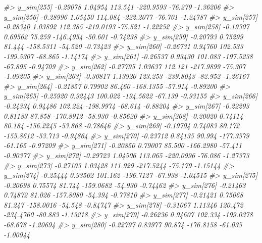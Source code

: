 \documentclass[
  10pt,
  italian,
  a4paper,
  extrafontsizes,onecolumn,openright
  ]{memoir}
\newenvironment{Shaded}{\begin{snugshade}}{\end{snugshade}}
\newcommand{\CommentTok}[1]{\textcolor[rgb]{0.56,0.35,0.01}{\textit{#1}}}
\begin{document}
\begin{Shaded}
\begin{Highlighting}[]
\CommentTok{\#\textgreater{} y\_sim[255] {-}0.29078 1.04954 113.541 {-}220.9593 {-}76.279 {-}1.36206}
\CommentTok{\#\textgreater{} y\_sim[256] {-}0.28996 1.05450 114.084 {-}222.2077 {-}76.701 {-}1.24787}
\CommentTok{\#\textgreater{} y\_sim[257] {-}0.28340 1.03892 112.385 {-}219.0193 {-}75.521 {-}1.22252}
\CommentTok{\#\textgreater{} y\_sim[258] {-}0.19307 0.69562  75.259 {-}146.4954 {-}50.601 {-}0.74238}
\CommentTok{\#\textgreater{} y\_sim[259] {-}0.20793 0.75299  81.444 {-}158.5311 {-}54.520 {-}0.73423}
\CommentTok{\#\textgreater{} y\_sim[260] {-}0.26731 0.94760 102.533 {-}199.5307 {-}68.865 {-}1.14174}
\CommentTok{\#\textgreater{} y\_sim[261] {-}0.26537 0.93430 101.083 {-}197.5238 {-}67.895 {-}0.94709}
\CommentTok{\#\textgreater{} y\_sim[262] {-}0.27795 1.03637 112.121 {-}217.9899 {-}75.307 {-}1.09205}
\CommentTok{\#\textgreater{} y\_sim[263] {-}0.30817 1.13920 123.253 {-}239.8043 {-}82.952 {-}1.26167}
\CommentTok{\#\textgreater{} y\_sim[264] {-}0.21857 0.79902  86.460 {-}168.1355 {-}57.914 {-}0.89200}
\CommentTok{\#\textgreater{} y\_sim[265] {-}0.25920 0.92443 100.022 {-}194.5622 {-}67.139 {-}0.93155}
\CommentTok{\#\textgreater{} y\_sim[266] {-}0.24334 0.94486 102.224 {-}198.9974 {-}68.614 {-}0.88204}
\CommentTok{\#\textgreater{} y\_sim[267] {-}0.22293 0.81183  87.858 {-}170.8912 {-}58.930 {-}0.85620}
\CommentTok{\#\textgreater{} y\_sim[268] {-}0.20020 0.74114  80.184 {-}156.2245 {-}53.868 {-}0.78646}
\CommentTok{\#\textgreater{} y\_sim[269] {-}0.19704 0.74083  80.172 {-}155.8612 {-}53.713 {-}0.94864}
\CommentTok{\#\textgreater{} y\_sim[270] {-}0.23712 0.84135  90.994 {-}177.3579 {-}61.165 {-}0.97209}
\CommentTok{\#\textgreater{} y\_sim[271] {-}0.20850 0.79007  85.500 {-}166.2980 {-}57.411 {-}0.90377}
\CommentTok{\#\textgreater{} y\_sim[272] {-}0.29723 1.04506 113.065 {-}220.0996 {-}76.086 {-}1.27373}
\CommentTok{\#\textgreater{} y\_sim[273] {-}0.27103 1.03428 111.929 {-}217.5244 {-}75.179 {-}1.15144}
\CommentTok{\#\textgreater{} y\_sim[274] {-}0.25444 0.93502 101.162 {-}196.7127 {-}67.938 {-}1.04515}
\CommentTok{\#\textgreater{} y\_sim[275] {-}0.20698 0.75574  81.744 {-}159.0682 {-}54.930 {-}0.74462}
\CommentTok{\#\textgreater{} y\_sim[276] {-}0.21463 0.74872  81.026 {-}157.8080 {-}54.394 {-}0.77810}
\CommentTok{\#\textgreater{} y\_sim[277] {-}0.21421 0.75068  81.247 {-}158.0016 {-}54.548 {-}0.84747}
\CommentTok{\#\textgreater{} y\_sim[278] {-}0.31067 1.11346 120.472 {-}234.4760 {-}80.883 {-}1.13218}
\CommentTok{\#\textgreater{} y\_sim[279] {-}0.26236 0.94607 102.334 {-}199.0378 {-}68.678 {-}1.20694}
\CommentTok{\#\textgreater{} y\_sim[280] {-}0.22797 0.83977  90.874 {-}176.8158 {-}61.035 {-}1.00944}

\end{Highlighting}
\end{Shaded}
\end{document}
